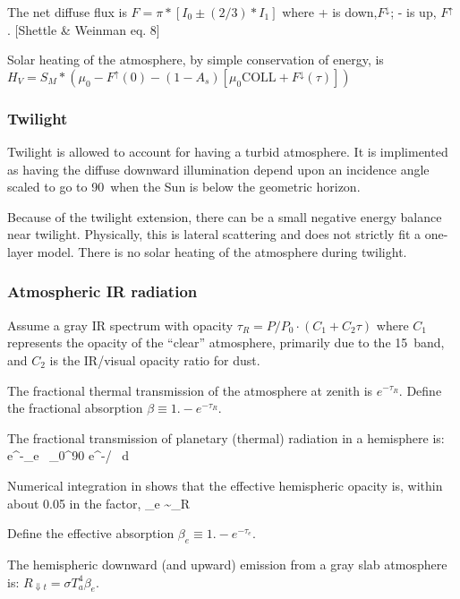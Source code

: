  The net diffuse flux is $ F = \pi* [I_0 \pm(2/3)*I_1]$ where  + is
 down,$F^\downarrow$;   - is up, $F^\uparrow$ .  [Shettle \& Weinman eq. 8]

Solar heating of the atmosphere, by simple conservation of energy, is 
 $ H_V = S_M*\left( \mu_0-F^\uparrow(0)-(1-A_s) 
\left[ \mu_0 \mathrm{COLL} +F^\downarrow(\tau) \right] \right) $

\subsubsection{Twilight \label{sec:twi}}
Twilight is allowed to account for having a turbid atmosphere. It is implimented
as having the diffuse downward illumination depend upon an incidence angle
scaled to go to 90\qd ~when the Sun is  below the geometric horizon. 

Because of the twilight extension, there can be a small negative energy balance
near twilight. Physically, this is lateral scattering and does not strictly fit
a one-layer model. There is no solar heating of the atmosphere during twilight.

\subsubsection{Atmospheric IR radiation}

Assume a gray IR spectrum with opacity  $\tau_R =P/P_0 \cdot (C_1+C_2\tau)$
where $C_1$ represents the opacity of the ``clear'' atmosphere, primarily due to
the 15\um ~band, and $C_2$ is the IR/visual opacity ratio for dust.

The fractional thermal transmission of the atmosphere at zenith is
$e^{-\tau_R}$. Define the fractional absorption $\beta \equiv 1. -e^{-\tau_R}$.


The fractional transmission of planetary (thermal) radiation in a hemisphere is:
\qbn  e^{-\tau_e} \equiv\
  \int_0^{90} e^{-\tau/\cos \theta} \cos \theta \sin \theta  \ d \theta \qen

Numerical integration in  shows that the effective
hemispheric opacity is, within about 0.05 in the factor,  
\qbn  \tau_e \sim {} \tau_R \qen

 Define the effective absorption $\beta_e \equiv 1. -e^{-\tau_e}$.

The hemispheric downward (and upward) emission from a gray slab atmosphere is:
$ R_{\Downarrow t} =\sigma T_a^4 \beta_e$.

